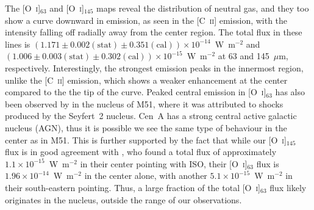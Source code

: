 \documentclass[preprint2]{aastex}
\begin{document}
The [O~\textsc{i}]$_{63}$ and [O~\textsc{i}]$_{145}$ maps reveal the distribution of neutral gas, and they too show a curve downward in emission, as seen in the [C~\textsc{ii}] emission, with the intensity falling off radially away from the center region.  The total flux in these lines is $(1.171 \pm 0.002 (\mathrm{stat}) \pm 0.351 (\mathrm{cal})) \times 10^{-14}$~W~m$^{-2}$ and $(1.006 \pm 0.003 (\mathrm{stat}) \pm 0.302 (\mathrm{cal})) \times 10^{-15}$~W~m$^{-2}$ at 63 and 145~$\mu$m, respectively.  Interestingly, the strongest emission peaks in the innermost region, unlike the [C~\textsc{ii}] emission, which shows a weaker enhancement at the center compared to the the tip of the curve.  Peaked central emission in [O~\textsc{i}]$_{63}$ has also been observed by \citet{parkin_2013} in the nucleus of M51, where it was attributed to shocks produced by the Seyfert~2 nucleus.  Cen~A has a strong central active galactic nucleus (AGN), thus it is possible we see the same type of behaviour in the center as in M51.  This is further supported by the fact that while our [O~\textsc{i}]$_{145}$ flux is in good agreement with \citet{2000A&A...355..885U}, who found a total flux of approximately $1.1 \times 10^{-15}$~W~m$^{-2}$ in their center pointing with ISO, their [O~\textsc{i}]$_{63}$ flux is $1.96 \times 10^{-14}$~W~m$^{-2}$ in the center alone, with another $5.1 \times 10^{-15}$~W~m$^{-2}$ in their south-eastern pointing.  Thus, a large fraction of the total [O~\textsc{i}]$_{63}$ flux likely originates in the nucleus, outside the range of our observations.
\end{document}
